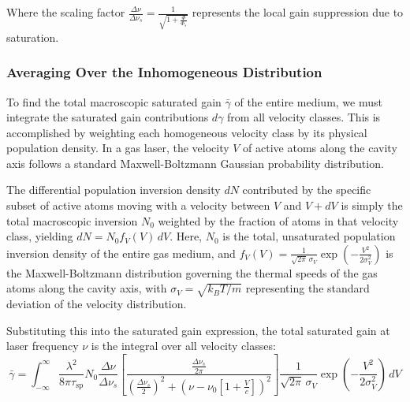 Where the scaling factor $\frac{\Delta\nu}{\Delta\nu_s} = \frac{1}{\sqrt{1 + \frac{\Phi}{\Phi_s}}}$ represents the local gain suppression due to saturation.

\subsubsection*{Averaging Over the Inhomogeneous Distribution}

To find the total macroscopic saturated gain $\bar{\gamma}$ of the entire medium, we must integrate the saturated gain contributions $d\gamma$ from all velocity classes. This is accomplished by weighting each homogeneous velocity class by its physical population density. In a gas laser, the velocity $V$ of active atoms along the cavity axis follows a standard Maxwell-Boltzmann Gaussian probability distribution.

The differential population inversion density $dN$ contributed by the specific subset of active atoms moving with a velocity between $V$ and $V+dV$ is simply the total macroscopic inversion $N_0$ weighted by the fraction of atoms in that velocity class, yielding $dN = N_0 f_V(V) \, dV$. Here, $N_0$ is the total, unsaturated population inversion density of the entire gas medium, and $f_V(V) = \frac{1}{\sqrt{2\pi}\,\sigma_V} \exp\!\left(-\frac{V^2}{2\sigma_V^2}\right)$ is the Maxwell-Boltzmann distribution governing the thermal speeds of the gas atoms along the cavity axis, with $\sigma_V = \sqrt{k_BT/m}$ representing the standard deviation of the velocity distribution.

Substituting this into the saturated gain expression, the total saturated gain at laser frequency $\nu$ is the integral over all velocity classes:
\begin{equation*}
    \bar{\gamma} = \int_{-\infty}^{\infty} \frac{\lambda^2}{8\pi\tau_{\mathrm{sp}}} N_0 \frac{\Delta\nu}{\Delta\nu_s} \left[ \frac{\frac{\Delta\nu_s}{2\pi}}{\left(\frac{\Delta\nu_s}{2}\right)^2 + \left(\nu - \nu_0\left[1+\frac{V}{c}\right]\right)^2} \right] \frac{1}{\sqrt{2\pi}\,\sigma_V} \exp\!\left(-\frac{V^2}{2\sigma_V^2}\right) \, dV \tag{I}
\end{equation*}


